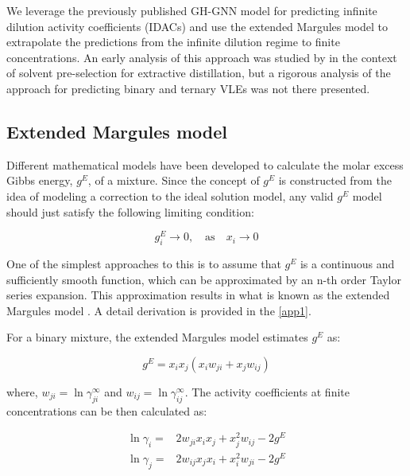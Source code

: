 We leverage the previously published GH-GNN model \cite{medina2023gibbs} for predicting infinite dilution activity coefficients (IDACs) and use the extended Margules model to extrapolate the predictions from the infinite dilution regime to finite concentrations. An early analysis of this approach was studied by \citet{medina2023solvent} in the context of solvent pre-selection for extractive distillation, but a rigorous analysis of the approach for predicting binary and ternary VLEs was not there presented. 

\subsection{Extended Margules model}

Different mathematical models have been developed to calculate the molar excess Gibbs energy, $g^E$, of a mixture. Since the concept of $g^E$ is constructed from the idea of modeling a correction to the ideal solution model, any valid $g^E$ model should just satisfy the following limiting condition:

\begin{equation}
    g_i^E \rightarrow 0, \quad \text{as} \quad x_i \rightarrow 0
    \label{eq_boundary_condition}
\end{equation}

One of the simplest approaches to this is to assume that $g^E$ is a continuous and sufficiently smooth function, which can be approximated by an n-th order Taylor series expansion. This approximation results in what is known as the extended Margules model \cite{mukhopadhyay1993discussion}.
A detail derivation is provided in the \ref{app1}.

For a binary mixture, the extended Margules model estimates $g^E$ as:

\begin{equation}
    g^E = x_i x_j (x_i w_{ji} + x_j w_{ij})
    \label{eq_ge_binary_final}
\end{equation}

\noindent where, $w_{ji} = \ln{\gamma_{ji}^\infty}$ and $w_{ij} = \ln{\gamma_{ij}^\infty}$. The activity coefficients at finite concentrations can be then calculated as:

\begin{align}
    \ln{\gamma_i} =& 2 w_{ji} x_i x_j + x_j^2 w_{ij} - 2 g^E \\
    \ln{\gamma_j} =& 2 w_{ij} x_j x_i + x_i^2 w_{ji} - 2 g^E
\end{align}

